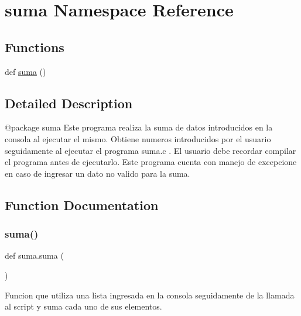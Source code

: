 \hypertarget{namespacesuma}{}\section{suma Namespace Reference}
\label{namespacesuma}
\subsection*{Functions}
\begin{DoxyCompactItemize}
\item 
def \hyperlink{namespacesuma_a2b49cb372ec6e31b107284e3aad8b0d8}{suma} ()
\end{DoxyCompactItemize}


\subsection{Detailed Description}
\begin{DoxyVerb}@package suma
Este programa realiza la suma de datos introducidos en la consola al ejecutar el mismo. Obtiene numeros introducidos por el usuario seguidamente al ejecutar el programa suma.c . El usuario debe recordar compilar el programa antes de ejecutarlo. Este programa cuenta con manejo de excepcione en caso de ingresar un dato no valido para la suma.
\end{DoxyVerb}
 

\subsection{Function Documentation}
\hypertarget{namespacesuma_a2b49cb372ec6e31b107284e3aad8b0d8}{}\label{namespacesuma_a2b49cb372ec6e31b107284e3aad8b0d8} 
\subsubsection{\texorpdfstring{suma()}{suma()}}
{\ttfamily def suma.\+suma (\begin{DoxyParamCaption}{ }\end{DoxyParamCaption})}

\begin{DoxyVerb}Funcion que utiliza una lista ingresada en la consola seguidamente de la llamada al script y suma cada uno de sus elementos.
\end{DoxyVerb}
 